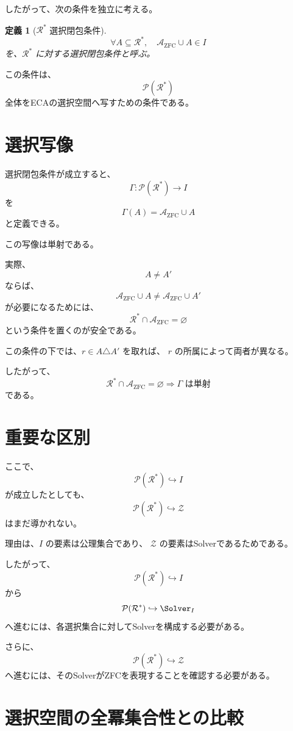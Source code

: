 \documentclass[11pt,a4paper]{article}
\newtheorem{definition}{定義}
\begin{document}
したがって、次の条件を独立に考える。

\begin{definition}[$\mathcal{R}^*$ 選択閉包条件]
\[
\boxed{
\forall A\subseteq\mathcal{R}^*,
\quad
\mathcal{A}_{\mathrm{ZFC}}\cup A\in I
}
\]
を、$\mathcal{R}^*$ に対する選択閉包条件と呼ぶ。
\end{definition}

この条件は、
\[
\mathcal{P}(\mathcal{R}^*)
\]
全体をECAの選択空間へ写すための条件である。

\section{選択写像}

選択閉包条件が成立すると、
\[
\Gamma:
\mathcal{P}(\mathcal{R}^*)
\longrightarrow I
\]
を
\[
\boxed{
\Gamma(A)=\mathcal{A}_{\mathrm{ZFC}}\cup A
}
\]
と定義できる。

この写像は単射である。

実際、
\[
A\neq A'
\]
ならば、
\[
\mathcal{A}_{\mathrm{ZFC}}\cup A
\neq
\mathcal{A}_{\mathrm{ZFC}}\cup A'
\]
が必要になるためには、
\[
\mathcal{R}^*\cap\mathcal{A}_{\mathrm{ZFC}}=\varnothing
\]
という条件を置くのが安全である。

この条件の下では、$r\in A\triangle A'$ を取れば、
$r$ の所属によって両者が異なる。

したがって、
\[
\boxed{
\mathcal{R}^*\cap\mathcal{A}_{\mathrm{ZFC}}=\varnothing
\Longrightarrow
\Gamma\text{ は単射}
}
\]
である。

\section{重要な区別}

ここで、
\[
\mathcal{P}(\mathcal{R}^*)\hookrightarrow I
\]
が成立したとしても、
\[
\mathcal{P}(\mathcal{R}^*)\hookrightarrow\mathcal{Z}
\]
はまだ導かれない。

理由は、$I$ の要素は公理集合であり、
$\mathcal{Z}$ の要素はSolverであるためである。

したがって、
\[
\mathcal{P}(\mathcal{R}^*)
\hookrightarrow I
\]
から
\[
\mathcal{P}(\mathcal{R}^*)
\hookrightarrow\Solver_I
\]
へ進むには、各選択集合に対してSolverを構成する必要がある。

さらに、
\[
\mathcal{P}(\mathcal{R}^*)
\hookrightarrow\mathcal{Z}
\]
へ進むには、そのSolverがZFCを表現することを確認する必要がある。

\section{選択空間の全冪集合性との比較}
\end{document}
